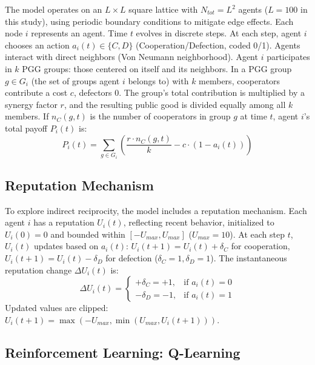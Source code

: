 \documentclass[preprint,number,sort&compress,12pt]{elsarticle}
\begin{document}
The model operates on an $L \times L$ square lattice with $N_{tot} = L^2$ agents ($L = 100$ in this study), using periodic boundary conditions to mitigate edge effects. Each node $i$ represents an agent. Time $t$ evolves in discrete steps. At each step, agent $i$ chooses an action $a_i(t) \in \{C, D\}$ (Cooperation/Defection, coded 0/1). Agents interact with direct neighbors (Von Neumann neighborhood). Agent $i$ participates in $k$ PGG groups: those centered on itself and its neighbors. In a PGG group $g \in G_i$ (the set of groups agent $i$ belongs to) with $k$ members, cooperators contribute a cost $c$, defectors 0. The group's total contribution is multiplied by a synergy factor $r$, and the resulting public good is divided equally among all $k$ members. If $n_C(g, t)$ is the number of cooperators in group $g$ at time $t$, agent $i$'s total payoff $P_i(t)$ is:
\begin{equation}
P_i(t) = \sum_{g \in G_i} \left( \frac{r \cdot n_C(g, t)}{k} - c \cdot (1 - a_i(t))\right)
\label{eq:payoff_model_original_restored}
\end{equation}

\subsection{Reputation Mechanism}

To explore indirect reciprocity, the model includes a reputation mechanism. Each agent $i$ has a reputation $U_i(t)$, reflecting recent behavior, initialized to $U_i(0) = 0$ and bounded within $[-U_{max}, U_{max}]$ ($U_{max} = 10$). At each step $t$, $U_i(t)$ updates based on $a_i(t)$: $U_i(t+1) = U_i(t) + \delta_C$ for cooperation, $U_i(t+1) = U_i(t) - \delta_D$ for defection ($\delta_C = 1, \delta_D = 1$). The instantaneous reputation change $\Delta U_i(t)$ is:
\begin{equation}
\Delta U_i(t) =
\begin{cases}
+\delta_C = +1, & \text{if } a_i(t) = 0 \\
-\delta_D = -1, & \text{if } a_i(t) = 1
\end{cases}
\label{eq:rep_change_model_restored}
\end{equation}
Updated values are clipped: $U_i(t+1) = \max(-U_{max}, \min(U_{max}, U_i(t+1)))$.

\subsection{Reinforcement Learning: Q-Learning}
\end{document}
